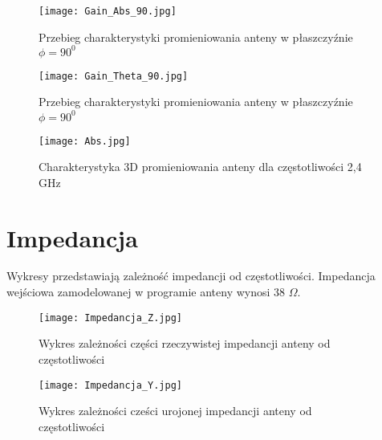 \begin{figure}[h!]
\centering
	\texttt{[image: Gain\_Abs\_90.jpg]}
	\caption{Przebieg charakterystyki promieniowania anteny w płaszczyźnie $\phi = 90^{0}$}
\end{figure}

\noindent
\newline

\begin{figure}[h!]
\centering
	\texttt{[image: Gain\_Theta\_90.jpg]}
	\caption{Przebieg charakterystyki promieniowania anteny w płaszczyźnie $\phi = 90^{0}$}
\end{figure}

\noindent
\newline

\begin{figure}[h!]
\centering
	\texttt{[image: Abs.jpg]}
	\caption{Charakterystyka 3D promieniowania anteny dla częstotliwości 2,4 GHz}
\end{figure}



\noindent
\newline
\newpage

\section{Impedancja}
Wykresy przedstawiają zależność impedancji od częstotliwości. 
\newline Impedancja wejściowa zamodelowanej w programie anteny wynosi 38 \(\Omega\).

\begin{figure}[h!]
\centering
	\texttt{[image: Impedancja\_Z.jpg]}
	\caption{Wykres zależności części rzeczywistej impedancji anteny od częstotliwości}
\end{figure}


\begin{figure}[h!]
\centering
	\texttt{[image: Impedancja\_Y.jpg]}
	\caption{Wykres zależności cześci urojonej impedancji anteny od częstotliwości}
\end{figure}


















